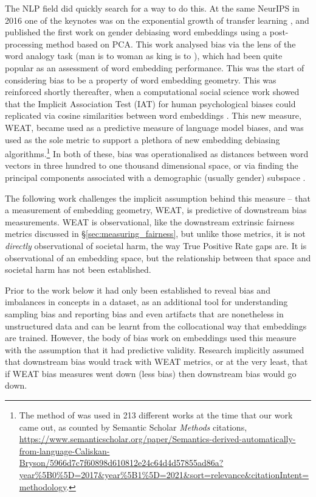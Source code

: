 The NLP field did quickly search for a way to do this. At the same NeurIPS in 2016 one of the keynotes was on the exponential growth of transfer learning \citep{ng2016nuts}, and \citet{bolukbasi} published the first work on gender debiasing word embeddings using a post-processing method based on PCA. This work analysed bias via the lens of the word analogy task (man is to woman as king is to \textunderscore), which had been quite popular as an assessment of word embedding performance. This was the start of considering bias to be a property of word embedding geometry.
This was reinforced shortly thereafter, when a computational social science work showed that the Implicit Association Test (IAT) for human psychological biases could replicated via cosine similarities between word embeddings \citet{Caliskan2017SemanticsDA}. This new measure, WEAT, became used as a predictive measure of language model biases, and was used as the sole metric to support a plethora of new embedding debiasing algorithms.\footnote{The method of \citet{Caliskan2017SemanticsDA} was used in 213 different works at the time that our work came out, as counted by Semantic Scholar \textit{Methods} citations, \url{https://www.semanticscholar.org/paper/Semantics-derived-automatically-from-language-Caliskan-Bryson/5966d7c7f60898d610812e24c64d4d57855ad86a?year\%5B0\%5D=2017&year\%5B1\%5D=2021&sort=relevance&citationIntent=methodology}.}  
In both of these, bias was operationalised as distances between word vectors in three hundred to one thousand dimensional space, or via finding the principal components associated with a demographic (usually gender) subspace \citep{ethayarajh-etal-2019-understanding}. 

The following work challenges the implicit assumption behind this measure -- that a measurement of embedding geometry, WEAT, is predictive of downstream bias measurements.
WEAT is observational, like the downstream extrinsic fairness metrics discussed in \S \ref{sec:measuring_fairness}, but unlike those metrics, it is not \textit{directly} observational of societal harm, the way True Positive Rate gaps are. It is observational of an embedding space, but the relationship between that space and societal harm has not been established. 

Prior to the work below it had only been established to reveal bias and imbalances in concepts in a dataset, as an additional tool for understanding sampling bias and reporting bias and even artifacts that are nonetheless in unstructured data and can be learnt from the collocational way that embeddings are trained. However, the body of bias work on embeddings used this measure with the assumption that it had predictive validity. Research implicitly assumed that downstream bias would track with WEAT metrics, or at the very least, that if WEAT bias measures went down (less bias) then downstream bias would go down.

